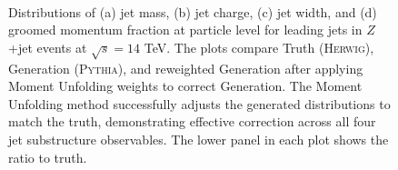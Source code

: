 \begin{figure}
\\
\caption[Jet substructure distributions comparing truth, generation, and Moment Unfolding results]{Distributions of (a) jet mass, (b) jet charge, (c) jet width, and (d) groomed momentum fraction at particle level for leading jets in $Z$+jet events at $\sqrt{s} = 14$ TeV. The plots compare Truth (\textsc{Herwig}), Generation (\textsc{Pythia}), and reweighted Generation after applying Moment Unfolding weights to correct Generation.
%
The Moment Unfolding method successfully adjusts the generated distributions to match the truth, demonstrating effective correction across all four jet substructure observables. The lower panel in each plot shows the ratio to truth.}
\label{fig:jetexample_dists}
\end{figure}
